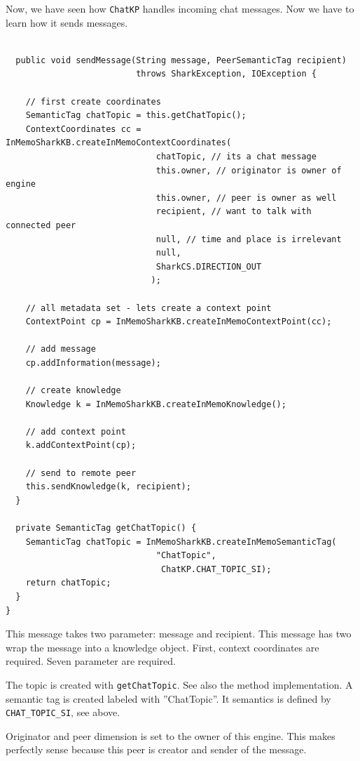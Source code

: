 {Now, we have seen how {\tt ChatKP} handles incoming chat messages. Now we have to learn how it sends messages.

\begin{verbatim}

  public void sendMessage(String message, PeerSemanticTag recipient) 
                          throws SharkException, IOException {

    // first create coordinates
    SemanticTag chatTopic = this.getChatTopic();
    ContextCoordinates cc = InMemoSharkKB.createInMemoContextCoordinates(
                              chatTopic, // its a chat message
                              this.owner, // originator is owner of engine
                              this.owner, // peer is owner as well
                              recipient, // want to talk with connected peer
                              null, // time and place is irrelevant
                              null, 
                              SharkCS.DIRECTION_OUT
                             );

    // all metadata set - lets create a context point
    ContextPoint cp = InMemoSharkKB.createInMemoContextPoint(cc);

    // add message
    cp.addInformation(message);

    // create knowledge
    Knowledge k = InMemoSharkKB.createInMemoKnowledge();

    // add context point
    k.addContextPoint(cp);

    // send to remote peer
    this.sendKnowledge(k, recipient);
  }

  private SemanticTag getChatTopic() {
    SemanticTag chatTopic = InMemoSharkKB.createInMemoSemanticTag(
                              "ChatTopic",   
                               ChatKP.CHAT_TOPIC_SI);
    return chatTopic;
  }
}
\end{verbatim}

This message takes two parameter: message and recipient. This message has two wrap the message into a knowledge object. First, context coordinates are required. Seven parameter are required.

The topic is created with {\tt getChatTopic}. See also the method implementation. A semantic tag is created labeled with ''ChatTopic''. It semantics is defined by {\tt CHAT\_TOPIC\_SI}, see above. 

Originator and peer dimension is set to the owner of this engine. This makes
perfectly sense because this peer is creator and sender of the message. 

}
